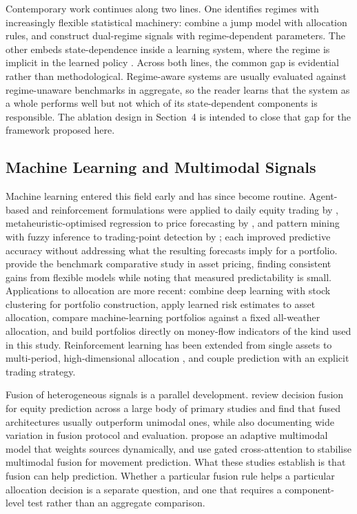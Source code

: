 Contemporary work continues along two lines. One identifies regimes with increasingly
flexible statistical machinery: \citet{li25} combine a jump model with allocation
rules, and \citet{luo26} construct dual-regime signals with regime-dependent
parameters. The other embeds state-dependence inside a learning system, where the
regime is implicit in the learned policy \citep{jiang25}. Across both lines, the common
gap is evidential rather than methodological. Regime-aware systems are usually
evaluated against regime-unaware benchmarks in aggregate, so the reader learns that the
system as a whole performs well but not which of its state-dependent components is
responsible. The ablation design in Section~4 is intended to close that gap for the
framework proposed here.

\subsection{Machine Learning and Multimodal Signals}

Machine learning entered this field early and has since become routine. Agent-based
and reinforcement formulations were applied to daily equity trading by \citet{lee07},
metaheuristic-optimised regression to price forecasting by \citet{chou18}, and pattern
mining with fuzzy inference to trading-point detection by \citet{huang20}; each
improved predictive accuracy without addressing what the resulting forecasts imply for a
portfolio. \citet{gu20} provide the benchmark comparative study in asset pricing,
finding consistent gains from flexible models while noting that measured predictability
is small. Applications to allocation
are more recent: \citet{ashrafzadeh25} combine deep learning with stock clustering for
portfolio construction, \citet{agal25} apply learned risk estimates to asset
allocation, \citet{ha26} compare machine-learning portfolios against a fixed
all-weather allocation, and \citet{singsiri26} build portfolios directly on money-flow
indicators of the kind used in this study. Reinforcement learning has been extended from single assets to
multi-period, high-dimensional allocation \citep{jiang25, saijai26}, and
\citet{wang26} couple prediction with an explicit trading strategy.

Fusion of heterogeneous signals is a parallel development. \citet{zhang22} review
decision fusion for equity prediction across a large body of primary studies and find
that fused architectures usually outperform unimodal ones, while also documenting wide
variation in fusion protocol and evaluation. \citet{farimani24} propose an adaptive
multimodal model that weights sources dynamically, and \citet{zong25} use gated
cross-attention to stabilise multimodal fusion for movement prediction. What these
studies establish is that fusion can help prediction. Whether a particular fusion rule
helps a particular allocation decision is a separate question, and one that requires a
component-level test rather than an aggregate comparison.


